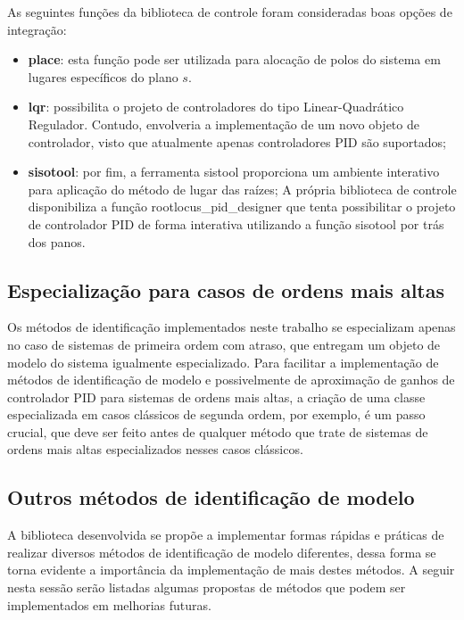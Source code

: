 As seguintes funções da biblioteca de controle foram consideradas boas opções de integração:
\begin{itemize}
    \item \textbf{place}: esta função pode ser utilizada para alocação de polos do sistema em lugares específicos do plano $s$.
    \item \textbf{lqr}: possibilita o projeto de controladores do tipo Linear-Quadrático Regulador.
    Contudo, envolveria a implementação de um novo objeto de controlador, visto que atualmente apenas controladores PID
    são suportados;
    \item \textbf{sisotool}: por fim, a ferramenta sistool proporciona um ambiente interativo para aplicação do método
    de lugar das raízes;
    A própria biblioteca de controle disponibiliza a função rootlocus\_pid\_designer que tenta possibilitar o projeto
    de controlador PID de forma interativa utilizando a função sisotool por trás dos panos.
\end{itemize}


\subsection{Especialização para casos de ordens mais altas}
Os métodos de identificação implementados neste trabalho se especializam apenas no caso de sistemas de primeira ordem
com atraso, que entregam um objeto de modelo do sistema igualmente especializado.
Para facilitar a implementação de métodos de identificação de modelo e possivelmente de aproximação de ganhos de
controlador PID para sistemas de ordens mais altas, a criação de uma classe especializada em casos clássicos de
segunda ordem, por exemplo, é um passo crucial, que deve ser feito antes de qualquer método que trate de sistemas
de ordens mais altas especializados nesses casos clássicos.

\subsection{Outros métodos de identificação de modelo}\label{subsec:outros-metodos-de-identificacao-de-modelo}
A biblioteca desenvolvida se propõe a implementar formas rápidas e práticas de realizar diversos métodos de identificação de modelo diferentes, dessa forma se torna evidente a importância da implementação de mais destes métodos.
A seguir nesta sessão serão listadas algumas propostas de métodos que podem ser implementados em melhorias futuras.

